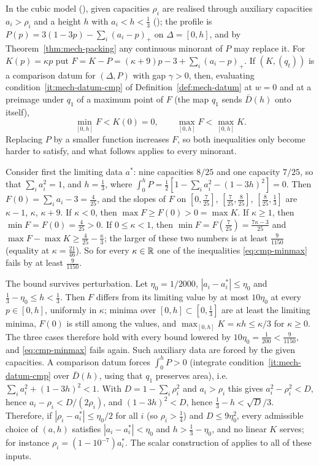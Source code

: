 \begin{remark}\label{rem:cmp-linear-fails}
In the cubic model (), given capacities $\rho_i$ are realised through auxiliary capacities
$a_i>\rho_i$ and a height $h$ with $a_i<h<\frac13$ (); the profile is
$P(p)=3(1-3p)-\sum_i(a_i-p)_+$ on $\Delta=[0,h]$, and by Theorem~\ref{thm:mech-packing} any continuous minorant of $P$
may replace it. For $K(p)=\kappa p$ put $F=K-P=(\kappa+9)p-3+\sum_i(a_i-p)_+$. If $(K,(q_t))$ is a comparison datum for
$(\Delta,P)$ with gap $\gamma>0$, then, evaluating condition~\ref{it:mech-datum-cmp} of Definition~\ref{def:mech-datum} at $w=0$ and at a
preimage under $q_1$ of a maximum point of $F$ (the map $q_1$ sends $\bar D(h)$ onto itself),
\begin{equation}\label{eq:cmp-minmax}
 \min_{[0,h]}F<K(0)=0,\qquad \max_{[0,h]}F<\max_{[0,h]}K .
\end{equation}
Replacing $P$ by a smaller function increases $F$, so both inequalities only become harder to satisfy, and what
follows applies to every minorant.

Consider first the limiting data $a^*$: nine capacities $8/25$ and one capacity $7/25$, so that $\sum_ia_i^2=1$, and
$h=\frac13$, where $\int_0^hP=\frac12[1-\sum_ia_i^2-(1-3h)^2]=0$. Then $F(0)=\sum_ia_i-3=\frac4{25}$, and the slopes of
$F$ on $[0,\frac7{25}]$, $[\frac7{25},\frac8{25}]$, $[\frac8{25},\frac13]$ are $\kappa-1$, $\kappa$, $\kappa+9$. If
$\kappa<0$, then $\max F\ge F(0)>0=\max K$. If $\kappa\ge1$, then $\min F=F(0)=\frac4{25}>0$. If $0\le\kappa<1$, then
$\min F=F(\frac7{25})=\frac{7\kappa-3}{25}$ and $\max F-\max K\ge\frac4{25}-\frac\kappa3$; the larger of these two
numbers is at least $\frac9{1150}$ (equality at $\kappa=\frac{21}{46}$). So for every $\kappa\in\mathbb{R}$ one of the
inequalities \eqref{eq:cmp-minmax} fails by at least $\frac9{1150}$.

The bound survives perturbation. Let $\eta_0=1/2000$, $|a_i-a^*_i|\le\eta_0$ and $\frac13-\eta_0\le h<\frac13$. Then
$F$ differs from its limiting value by at most $10\eta_0$ at every $p\in[0,h]$, uniformly in $\kappa$; minima over
$[0,h]\subset[0,\frac13]$ are at least the limiting minima, $F(0)$ is still among the values, and
$\max_{[0,h]}K=\kappa h\le\kappa/3$ for $\kappa\ge0$. The three cases therefore hold with every bound lowered by
$10\eta_0=\frac1{200}<\frac9{1150}$, and \eqref{eq:cmp-minmax} fails again. Such auxiliary data are forced by the
given capacities. A comparison datum forces $\int_0^hP>0$ (integrate condition~\ref{it:mech-datum-cmp} over $\bar D(h)$, using that
$q_1$ preserves area), i.e.\ $\sum_ia_i^2+(1-3h)^2<1$. With $D=1-\sum_i\rho_i^2$ and $a_i>\rho_i$ this gives
$a_i^2-\rho_i^2<D$, hence $a_i-\rho_i<D/(2\rho_i)$, and $(1-3h)^2<D$, hence $\frac13-h<\sqrt D/3$. Therefore, if
$|\rho_i-a^*_i|\le\eta_0/2$ for all $i$ (so $\rho_i>\frac14$) and $D\le9\eta_0^2$, every admissible choice of $(a,h)$
satisfies $|a_i-a^*_i|<\eta_0$ and $h>\frac13-\eta_0$, and no linear $K$ serves; for instance
$\rho_i=(1-10^{-7})a^*_i$. The scalar construction of  applies to all of these inputs.
\end{remark}
